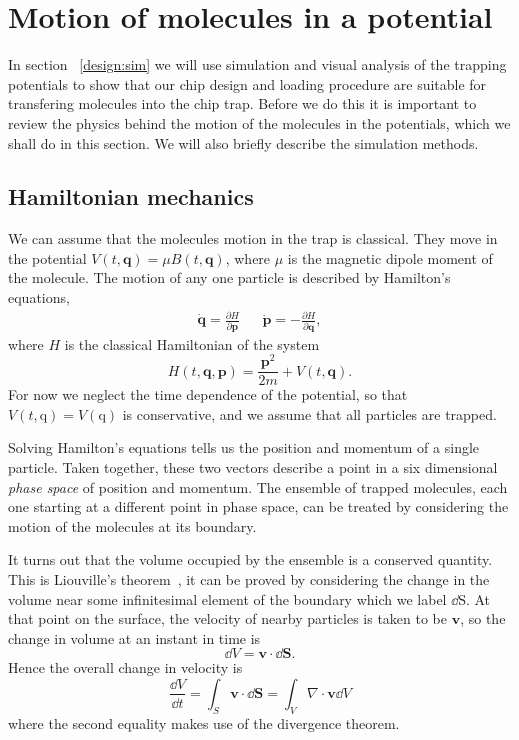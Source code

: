\section{Motion of molecules in a potential}

In section ~\ref{design:sim} we will use simulation and visual analysis of the
trapping potentials to show that our chip design and loading procedure are
suitable for transfering molecules into the chip trap. Before we do this it is
important to review the physics behind the motion of the molecules in the
potentials, which we shall do in this section. We will also briefly describe
the simulation methods.

\subsection{Hamiltonian mechanics}

We can assume that the molecules motion in the trap is classical. They move in
the potential $V(t, \mathbf{q}) = \mu B(t, \mathbf{q})$, where $\mu$ is the
magnetic dipole moment of the molecule.  The motion of any one particle is
described by Hamilton's equations,~\cite{Lichtenberg1969}
%
\begin{align}
  \label{design:eq:hamilton}
  \dot{\mathbf{q}} =  \frac{\partial H}{\partial \mathbf{p}} &&
  \dot{\mathbf{p}} = -\frac{\partial H}{\partial \mathbf{q}},
\end{align}
%
where $H$ is the classical Hamiltonian of the system
\begin{equation}
  H(t, \mathbf{q}, \mathbf{p}) = \frac{\mathbf{p}^2}{2m} + V(t, \mathbf{q}).
\end{equation}
For now we neglect the time dependence of the potential, so that $V(t,
\mathrm{q}) = V(\mathrm{q})$ is conservative, and we assume that all particles
are trapped.

Solving Hamilton's equations tells us the position and momentum of a single
particle. Taken together, these two vectors describe a point in a six
dimensional \emph{phase space} of position and momentum. The ensemble of
trapped molecules, each one starting at a different point in phase space, can
be treated by considering the motion of the molecules at its
boundary.~\cite{Hand1998}

It turns out that the volume occupied by the ensemble is a conserved quantity.
This is Liouville's theorem~\cite{Landau1982}, it can be proved by considering
the change in the volume near some infinitesimal element of the boundary which
we label $\dd \mathrm{S}$. At that point on the surface, the velocity of nearby
particles is taken to be $\mathbf{v}$, so the change in volume at an instant in
time is~\cite{Hand1998}
%
\begin{equation}
  \dd V = \mathbf{v} \cdot \dd \mathbf{S}.
\end{equation}
%
Hence the overall change in velocity is
%
\begin{equation}
  \frac{\dd V}{\dd t} = \int_S \mathbf{v} \cdot \dd \mathbf{S} = \int_V \nabla 
  \cdot \mathbf{v} \dd V
\end{equation}
where the second equality makes use of the divergence theorem.

